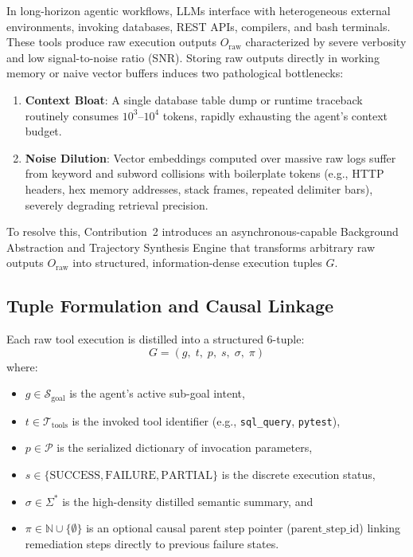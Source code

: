 \documentclass[lettersize,journal]{IEEEtran}
\begin{document}
In long-horizon agentic workflows, LLMs interface with heterogeneous external environments, invoking databases, REST APIs, compilers, and bash terminals. These tools produce raw execution outputs $O_{\text{raw}}$ characterized by severe verbosity and low signal-to-noise ratio (SNR). Storing raw outputs directly in working memory or naive vector buffers induces two pathological bottlenecks:

\begin{enumerate}
    \item \textbf{Context Bloat}: A single database table dump or runtime traceback routinely consumes $10^3$--$10^4$ tokens, rapidly exhausting the agent's context budget.
    \item \textbf{Noise Dilution}: Vector embeddings computed over massive raw logs suffer from keyword and subword collisions with boilerplate tokens (e.g., HTTP headers, hex memory addresses, stack frames, repeated delimiter bars), severely degrading retrieval precision.
\end{enumerate}

To resolve this, Contribution~2 introduces an asynchronous-capable Background Abstraction and Trajectory Synthesis Engine that transforms arbitrary raw outputs $O_{\text{raw}}$ into structured, information-dense execution tuples $G$.

\subsection{Tuple Formulation and Causal Linkage}

Each raw tool execution is distilled into a structured 6-tuple:
\begin{equation}
\label{eq:tuple_full}
G = (g,\; t,\; p,\; s,\; \sigma,\; \pi)
\end{equation}
where:
\begin{itemize}
    \item $g \in \mathcal{S}_{\text{goal}}$ is the agent's active sub-goal intent,
    \item $t \in \mathcal{T}_{\text{tools}}$ is the invoked tool identifier (e.g., \texttt{sql\_query}, \texttt{pytest}),
    \item $p \in \mathcal{P}$ is the serialized dictionary of invocation parameters,
    \item $s \in \{\text{SUCCESS}, \text{FAILURE}, \text{PARTIAL}\}$ is the discrete execution status,
    \item $\sigma \in \Sigma^*$ is the high-density distilled semantic summary, and
    \item $\pi \in \mathbb{N} \cup \{\emptyset\}$ is an optional causal parent step pointer ($\text{parent\_step\_id}$) linking remediation steps directly to previous failure states.
\end{itemize}
\end{document}
